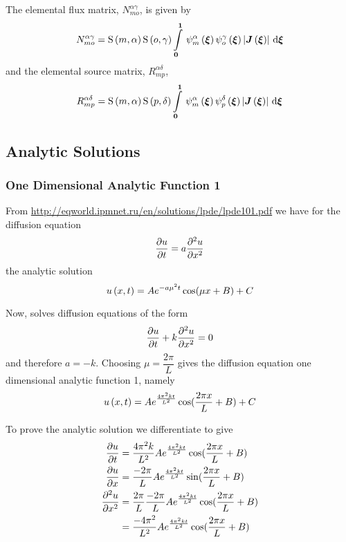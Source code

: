 The elemental flux matrix, $N^{\alpha\gamma}_{mo}$, is given by
\begin{equation}
  N^{\alpha\gamma}_{mo} =\gsf{m}{\alpha}\gsf{o}{\gamma}
  \gint{\vectr{0}}{\vectr{1}}{\gbfn{m}{\alpha}{\vectr{\xi}}\gbfn{o}{\gamma}{\vectr{\xi}}
    \abs{\fnof{\matr{J}}{\vectr{\xi}}}}{\vectr{\xi}}
\end{equation}
and the elemental source matrix, $R^{\alpha\delta}_{mp}$, 
\begin{equation}
  R^{\alpha\delta}_{mp}=\gsf{m}{\alpha}\gsf{p}{\delta}
  \gint{\vectr{0}}{\vectr{1}}{\gbfn{m}{\alpha}{\vectr{\xi}}\gbfn{p}{\delta}{\vectr{\xi}}
    \abs{\fnof{\matr{J}}{\vectr{\xi}}}}{\vectr{\xi}}
\end{equation}

\subsection{Analytic Solutions}


\subsubsection{One Dimensional Analytic Function 1}

From \url{http://eqworld.ipmnet.ru/en/solutions/lpde/lpde101.pdf} we have for the \oned diffusion equation
\begin{equation}
   \dfrac{\partial u}{\partial t} =a \dfrac{\partial^{2} u}{\partial {x}^{2}} 
\end{equation}
the analytic solution
\begin{equation}
   u\left( x,t \right) =Ae^{-a\mu^{2}t}\cos(\mu x + B) + C
\end{equation}

Now, \OpenCMISS solves diffusion equations of the form
\begin{equation}
  \delby{u}{t}+k\deltwosqby{u}{x}=0
  \label{eqn:OpenCMISSDiffusionEquationOneDim}
\end{equation}
and therefore $a=-k$. Choosing $\mu=\dfrac{2\pi}{L}$ gives the
\OpenCMISS diffusion equation one dimensional analytic function 1, namely
\begin{equation}
  \fnof{u}{x,t}=Ae^{\frac{4\pi^{2}kt}{L^{2}}}\cos(\frac{2\pi x}{L} + B) + C
  \label{eqn:AnalyticDiffusionEquationOneDim1}
\end{equation}

To prove the analytic solution we differentiate
 to give
\begin{align}
    \delby{u}{t} &=
    \dfrac{4\pi^{2}k}{L^{2}}Ae^{\frac{4\pi^{2}kt}{L^{2}}}\cos(\frac{2\pi x}{L} + B) \\
    \delby{u}{x} &=
    \dfrac{-2\pi}{L}Ae^{\frac{4\pi^{2}kt}{L^{2}}}\sin(\frac{2\pi x}{L} + B) \\
    \deltwosqby{u}{x} &=
    \dfrac{2\pi}{L}\dfrac{-2\pi}{L}Ae^{\frac{4\pi^{2}kt}{L^{2}}}\cos(\frac{2\pi x}{L} + B) \\
    & = \dfrac{-4\pi^{2}}{L^{2}}Ae^{\frac{4\pi^{2}kt}{L^{2}}}\cos(\frac{2\pi x}{L} + B)
  \label{eqn:AnalyticDiffusionEquationOneDim1Derivatives}
\end{align}

